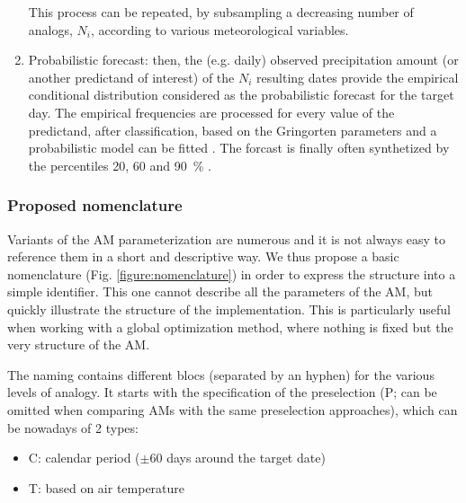 \documentclass[review]{elsarticle}
\begin{document}
\begin{enumerate}
	This process can be repeated, by subsampling a decreasing number of analogs, $N_{i}$, according to various meteorological variables.
	
	\item Probabilistic forecast: then, the (e.g. daily) observed precipitation amount (or another predictand of interest) of the $N_{i}$ resulting dates provide the empirical conditional distribution considered as the probabilistic forecast for the target day. The empirical frequencies are processed for every value of the predictand, after classification, based on the Gringorten parameters \cite[for a Gumbel or exponential law; see][]{Gringorten1963} and a probabilistic model can be fitted \citep[e.g. Gamma function,][]{Obled2002}. The forcast is finally often synthetized by the percentiles 20, 60 and 90~\% \citep{Guilbaud1997, Guilbaud1998}.
	
\end{enumerate}


\subsubsection{Proposed nomenclature}

Variants of the AM parameterization are numerous and it is not always easy to reference them in a short and descriptive way. We thus propose a basic nomenclature (Fig. \ref{figure:nomenclature}) in order to express the structure into a simple identifier. This one cannot describe all the parameters of the AM, but quickly illustrate the structure of the implementation. This is particularly useful when working with a global optimization method, where nothing is fixed but the very structure of the AM.

The naming contains different blocs (separated by an hyphen) for the various levels of analogy. It starts with the specification of the preselection (P; can be omitted when comparing AMs with the same preselection approaches), which can be nowadays of 2 types:
\begin{itemize}
	\setlength\itemsep{-2px}
	\item C: calendar period ($\pm 60$ days around the target date)
	\item T: based on air temperature \citep{BenDaoud2010}
\end{itemize}
\end{document}
